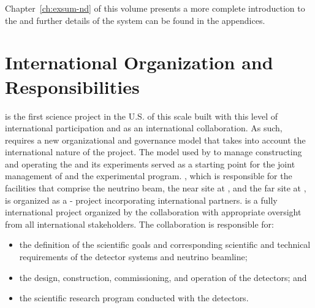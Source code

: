 Chapter~\ref{ch:exsum-nd} of this  volume presents a more complete introduction to the  and further details of the system can be found in the appendices. 

\section{International Organization and Responsibilities}
\label{es:ch1:intl-org-resp}

 is the first science project in the U.S. of this scale built with this level of international participation and as an international collaboration. As such,  requires a new organizational and governance model that takes into account the international nature of the project.
The
model used by  to manage constructing and operating the  and its experiments served as a starting point for the joint management of  and the  experimental program.  
, which is responsible for the facilities that comprise the neutrino beam, the near site at , and the far site at \surf{}, is organized as a
- project incorporating international partners. 
 is a fully international project
organized by the  collaboration with appropriate oversight from all international stakeholders.
The  collaboration is responsible for:
\begin{itemize}
\item the definition of the scientific goals and corresponding scientific and technical requirements of the detector systems and neutrino beamline;
\item the design, construction, commissioning, and operation of the detectors; and
\item the scientific research program conducted with the  detectors. 
\end{itemize}


